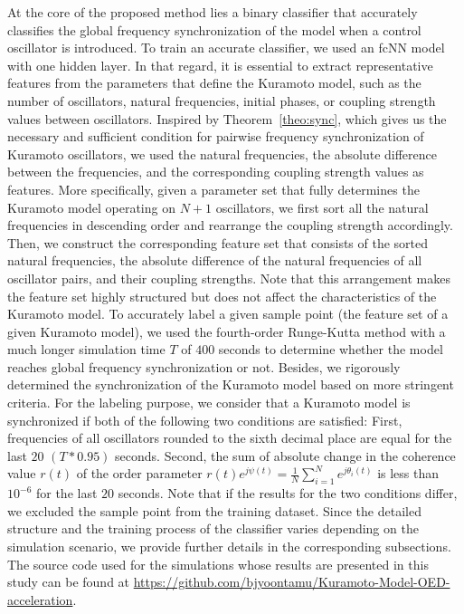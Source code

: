 \documentclass{article}
\begin{document}
At the core of the proposed method lies a binary classifier that accurately classifies the global frequency synchronization of the model when a control oscillator is introduced. To train an accurate classifier, we used an fcNN model with one hidden layer. In that regard, it is essential to extract representative features from the parameters that define the Kuramoto model, such as the number of oscillators, natural frequencies, initial phases, or coupling strength values between oscillators. Inspired by Theorem~\ref{theo:sync}, which gives us the necessary and sufficient condition for pairwise frequency synchronization of Kuramoto oscillators, we used the natural frequencies, the absolute difference between the frequencies, and the corresponding coupling strength values as features. More specifically, given a parameter set that fully determines the Kuramoto model operating on $N + 1$ oscillators, we first sort all the natural frequencies in descending order and rearrange the coupling strength accordingly. Then, we construct the corresponding feature set that consists of the sorted natural frequencies, the absolute difference of the natural frequencies of all oscillator pairs, and their coupling strengths. Note that this arrangement makes the feature set highly structured but does not affect the characteristics of the Kuramoto model. To accurately label a given sample point (the feature set of a given Kuramoto model), we used the fourth-order Runge-Kutta method with a much longer simulation time ${T}$ of ${400}$ seconds to determine whether the model reaches global frequency synchronization or not. Besides, we rigorously determined the synchronization of the Kuramoto model based on more stringent criteria. For the labeling purpose, we consider that a Kuramoto model is synchronized if both of the following two conditions are satisfied: First, frequencies of all oscillators rounded to the sixth decimal place are equal for the last ${20}$ $\left(T*0.95\right)$ seconds. Second, the sum of absolute change in the coherence value ${r\left(t\right)}$ of the order parameter ${r\left(t\right) e^{j \psi \left(t\right)} = \frac{1}{N} \sum^{N}_{i = 1} e^{j\theta_i\left(t\right)}}$ is less than $10^{-6}$ for the last ${20}$ seconds. Note that if the results for the two conditions differ, we excluded the sample point from the training dataset. Since the detailed structure and the training process of the classifier varies depending on the simulation scenario, we provide further details in the corresponding subsections. The source code used for the simulations whose results are presented in this study can be found at \href {https://github.com/bjyoontamu/Kuramoto-Model-OED-acceleration}{https://github.com/bjyoontamu/Kuramoto-Model-OED-acceleration}.
\end{document}

